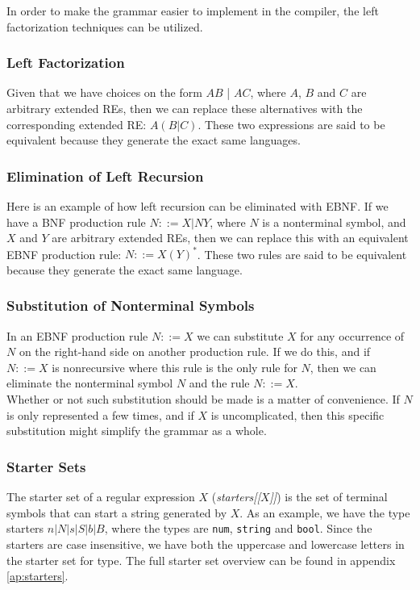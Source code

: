 In order to make the grammar easier to implement in the compiler, the left factorization techniques can be utilized.

\subsubsection*{Left Factorization}
Given that we have choices on the form $A B$ | $A C$, where $A$, $B$ and $C$ are arbitrary extended REs, then we can replace these alternatives with the corresponding extended RE: $A (B | C)$. These two expressions are said to be equivalent because they generate the exact same languages.

\subsubsection*{Elimination of Left Recursion}
Here is an example of how left recursion can be eliminated with EBNF. If we have a BNF production rule $N ::= X | N Y$, where $N$ is a nonterminal symbol, and $X$ and $Y$ are arbitrary extended REs, then we can replace this with an equivalent EBNF production rule: $N ::= X (Y)^*$. These two rules are said to be equivalent because they generate the exact same language.

\subsubsection*{Substitution of Nonterminal Symbols}
In an EBNF production rule $N::=X$ we can substitute $X$ for any occurrence of $N$ on the right-hand side on another production rule. If we do this, and if $N::=X$ is nonrecursive where this rule is the only rule for $N$, then we can eliminate the nonterminal symbol $N$ and the rule $N::=X$.\\ \indent
Whether or not such substitution should be made is a matter of convenience. If $N$ is only represented a few times, and if $X$ is uncomplicated, then this specific substitution might simplify the grammar as a whole.

\subsubsection*{Starter Sets}
The starter set of a regular expression $X$ (\textit{starters[[$X$]]}) is the set of terminal symbols that can start a string generated by $X$. As an example, we have the type starters $n | N | s | S | b | B$, where the types are \texttt{num}, \texttt{string} and \texttt{bool}. Since the starters are case insensitive, we have both the uppercase and lowercase letters in the starter set for type. The full starter set overview can be found in appendix \ref{ap:starters}.